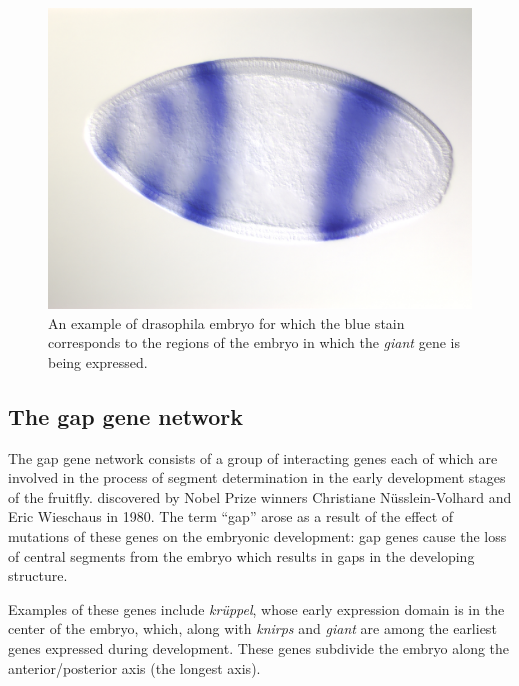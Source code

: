 
\begin{figure}[H]
\begin{center}
\includegraphics[scale=0.15]{embryo.png}
\end{center}
\caption{An example of drasophila embryo for which the blue stain corresponds to the regions of the embryo in which the \emph{giant} gene is being expressed.}
\label{fig:embryo}
\end{figure}


\subsection*{The gap gene network}

The gap gene network consists of a group of interacting genes each of which are involved in the process of segment determination in the early development stages of the fruitfly. discovered by Nobel Prize winners Christiane N\"{u}sslein-Volhard and Eric Wieschaus in 1980. The term ``gap'' arose as a result of the effect of mutations of these genes on the embryonic development: gap genes cause the loss of central segments from the embryo which results in gaps in the developing structure.

Examples of these genes include \emph{kr\"{u}ppel}, whose early expression domain is in the center of the embryo, which, along with \emph{knirps} and \emph{giant} are among the earliest genes expressed during development. These genes subdivide the embryo along the anterior/posterior axis (the longest axis).


